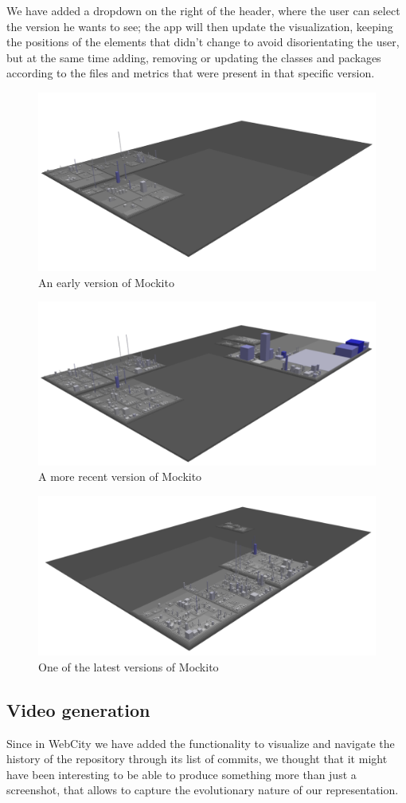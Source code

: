 \documentclass[]{usiinfbachelorproject}
\begin{document}
 We have added a dropdown on the right of the header, where the user can select the version he wants to see; the app will then update the visualization,  keeping the positions of the elements that didn't change to avoid disorientating the user, but at the same time adding, removing or updating the classes and packages according to the files and metrics that were present in that specific version.

 \begin{figure} [H]
 \centering
 \includegraphics[width=.6\textwidth]{pictures/version1.png}
 \caption{An early version of Mockito}
 \label{fig:version1}
 \end{figure}

 \begin{figure} [H]
 \centering
 \includegraphics[width=.6\textwidth]{pictures/version2.png}
 \caption{A more recent version of Mockito}
 \label{fig:version2}
 \end{figure}

 \begin{figure} [H]
 \centering
 \includegraphics[width=.6\textwidth]{pictures/version3.png}
 \caption{One of the latest versions of Mockito}
 \label{fig:version3}
 \end{figure}

\subsection{Video generation} \label{Video generation}
Since in WebCity we have added the functionality to visualize and navigate the history of the repository through its list of commits, we thought that it might have been interesting to be able to produce something more than just a screenshot, that allows to capture the evolutionary nature of our representation.
\end{document}
